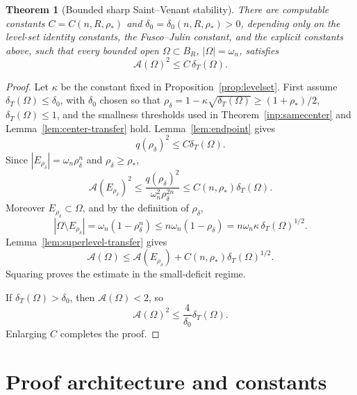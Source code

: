 \documentclass[11pt]{amsart}
\newtheorem{theorem}{Theorem}[section]
\theoremstyle{definition}
\newcommand{\Om}{\Omega}
\newcommand{\Fr}{\mathcal A}
\newcommand{\dT}{\delta_T}
\newcommand{\rstar}{\rho_*}
\newcommand{\rdel}{\rho_\delta}
\begin{document}
\begin{theorem}[Bounded sharp Saint--Venant stability]
\label{thm:boundedSV}
There are computable constants \(C=C(n,R,\rstar)\) and
\(\delta_0=\delta_0(n,R,\rstar)>0\), depending only on the level-set
identity constants, the Fusco--Julin constant, and the explicit constants
above, such that every bounded open \(\Om\subset B_R\),
\(|\Om|=\omega_n\), satisfies
\[
   \Fr(\Om)^2\le C\,\dT(\Om).
\]
\end{theorem}

\begin{proof}
Let \(\kappa\) be the constant fixed in Proposition~\ref{prop:levelset}.
First assume \(\dT(\Om)\le\delta_0\), with \(\delta_0\) chosen so that
\(\rdel=1-\kappa\sqrt{\dT(\Om)}\ge(1+\rstar)/2\), \(\dT(\Om)\le1\), and
the smallness thresholds used in Theorem~\ref{inp:samecenter} and
Lemma~\ref{lem:center-transfer} hold.
Lemma~\ref{lem:endpoint} gives
\[
   q(\rdel)^2\le C\dT(\Om).
\]
Since \(|E_{\rdel}|=\omega_n\rdel^n\) and \(\rdel\ge\rstar\),
\[
   \Fr(E_{\rdel})^2
   \le \frac{q(\rdel)^2}{\omega_n^2\rdel^{2n}}
   \le C(n,\rstar)\dT(\Om).
\]
Moreover \(E_{\rdel}\subset\Om\), and by the definition of \(\rdel\),
\[
   |\Om\setminus E_{\rdel}|
   =\omega_n(1-\rdel^n)
   \le n\omega_n(1-\rdel)
   =n\omega_n\kappa\,\dT(\Om)^{1/2}.
\]
Lemma~\ref{lem:superlevel-transfer} gives
\[
   \Fr(\Om)
   \le \Fr(E_{\rdel})+C(n,\rstar)\dT(\Om)^{1/2}.
\]
Squaring proves the estimate in the small-deficit regime.

If \(\dT(\Om)>\delta_0\), then \(\Fr(\Om)<2\), so
\[
   \Fr(\Om)^2\le \frac{4}{\delta_0}\dT(\Om).
\]
Enlarging \(C\) completes the proof.
\end{proof}

\section{Proof architecture and constants}\label{sec:architecture}
\end{document}
